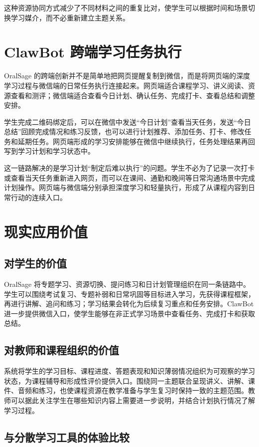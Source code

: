 这种资源协同方式减少了不同材料之间的重复比对，使学生可以根据时间和场景切换学习媒介，而不必重新建立主题关系。

\section{ClawBot 跨端学习任务执行}

OralSage 的跨端创新并不是简单地把网页提醒复制到微信，而是将网页端的深度学习过程与微信端的日常任务执行连接起来。网页端适合课程学习、讲义阅读、资源查看和测评；微信端适合查看今日计划、确认任务、完成打卡、查看总结和调整安排。

学生完成二维码绑定后，可以在微信中发送“今日计划”查看当天任务，发送“今日总结”回顾完成情况和练习反馈，也可以进行计划推荐、添加任务、打卡、修改任务和延期任务。网页端形成的学习安排能够在微信中继续执行，任务处理结果再回写到学习计划和学习状态中。

这一链路解决的是学习计划“制定后难以执行”的问题。学生不必为了记录一次打卡或查看当天任务重新进入网页，而可以在课间、通勤和晚间等日常沟通场景中完成计划操作。网页端与微信端分别承担深度学习和轻量执行，形成了从课程内容到日常行动的连续入口。

\section{现实应用价值}

\subsection{对学生的价值}

OralSage 将专题学习、资源切换、提问练习和日计划管理组织在同一条链路中。学生可以围绕考试复习、专题补弱和日常巩固等目标进入学习，先获得课程框架，再进行讲解、追问和练习；学习结果会转化为后续复习重点和任务安排。ClawBot 进一步提供微信入口，使学生能够在非正式学习场景中查看任务、完成打卡和获取总结。

\subsection{对教师和课程组织的价值}

系统将学生的学习目标、课程进度、答题表现和知识薄弱情况组织为可观察的学习状态，为课程辅导和形成性评价提供入口。围绕同一主题联合呈现讲义、讲解、课件、音频和练习，也使课程资源在教学准备与学生复习时保持一致的主题范围。教师可以据此关注学生在哪些知识内容上需要进一步说明，并结合计划执行情况了解学习过程。

\subsection{与分散学习工具的体验比较}

